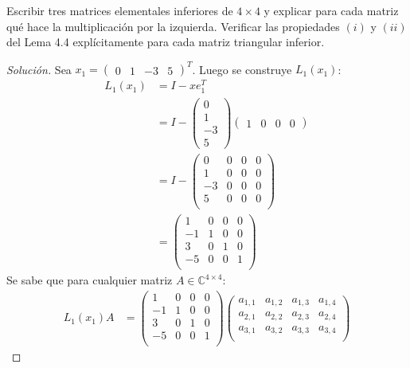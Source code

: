 \documentclass[12pt]{book}
\newcommand{\C}{\mathbb{C}}
\newenvironment{solucion}
  {\renewcommand\qedsymbol{$\square$}\begin{proof}[Solución]}
  {\end{proof}}
\begin{document}
\eje Escribir tres matrices elementales inferiores de $4\times4$ y explicar para cada matriz qué hace la multiplicación por la izquierda. Verificar las propiedades $(i)$ y $(ii)$ del Lema 4.4 explícitamente para cada matriz triangular inferior.
\begin{solucion}
Sea $x_1=\begin{pmatrix}0&1&-3&5\end{pmatrix}^T$. Luego se construye $L_1(x_1)$:
\begin{align*}
    L_1(x_1)&=I-xe_1^T\\[8pt]
    &=I-\begin{pmatrix}
    0\\
    1\\
    -3\\
    5
    \end{pmatrix}\begin{pmatrix}
    1 & 0 & 0 & 0
    \end{pmatrix}\\[8pt]
    &= I-\begin{pmatrix}
    0 & 0 & 0 & 0\\
    1 & 0 & 0 & 0\\
    -3 & 0 & 0 & 0\\
    5 & 0 & 0 & 0\\
    \end{pmatrix}\\[8pt]
    &=\begin{pmatrix}
    1 & 0 & 0 & 0\\
    -1 & 1 & 0 & 0\\
    3 & 0 & 1 & 0\\
    -5 & 0 & 0 & 1\\
    \end{pmatrix}
\end{align*}
Se sabe que para cualquier matriz $A\in\C^{4\times4}$:
\begin{align*}
    L_1(x_1)A&=\begin{pmatrix}
    1 & 0 & 0 & 0\\
    -1 & 1 & 0 & 0\\
    3 & 0 & 1 & 0\\
    -5 & 0 & 0 & 1\\
    \end{pmatrix}\begin{pmatrix}
    a_{1,1} & a_{1,2} & a_{1,3} & a_{1,4}\\
    a_{2,1} & a_{2,2} & a_{2,3} & a_{2,4}\\
    a_{3,1} & a_{3,2} & a_{3,3} & a_{3,4}\\

\end{pmatrix}
\end{align*}
\end{solucion}
\end{document}
